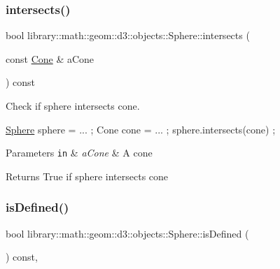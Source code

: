 \subsubsection{\texorpdfstring{intersects()}{intersects()}\hspace{0.1cm}{\footnotesize\ttfamily [9/9]}}
{\footnotesize\ttfamily bool library\+::math\+::geom\+::d3\+::objects\+::\+Sphere\+::intersects (\begin{DoxyParamCaption}\item[{const \hyperlink{classlibrary_1_1math_1_1geom_1_1d3_1_1objects_1_1_cone}{Cone} \&}]{a\+Cone }\end{DoxyParamCaption}) const}



Check if sphere intersects cone. 


\begin{DoxyCode}
\hyperlink{classlibrary_1_1math_1_1geom_1_1d3_1_1objects_1_1_sphere_a55dccc8ea16ee55cd7694c26afa8ea39}{Sphere} sphere = ... ;
Cone cone = ... ;
sphere.intersects(cone) ;
\end{DoxyCode}



\begin{DoxyParams}[1]{Parameters}
\mbox{\tt in}  & {\em a\+Cone} & A cone \\
\hline
\end{DoxyParams}
\begin{DoxyReturn}{Returns}
True if sphere intersects cone 
\end{DoxyReturn}
\mbox{\label{classlibrary_1_1math_1_1geom_1_1d3_1_1objects_1_1_sphere_a0598bd75f8a34e07a3ad36cf10a7f098}} 
\subsubsection{\texorpdfstring{is\+Defined()}{isDefined()}}
{\footnotesize\ttfamily bool library\+::math\+::geom\+::d3\+::objects\+::\+Sphere\+::is\+Defined (\begin{DoxyParamCaption}{ }\end{DoxyParamCaption}) const\hspace{0.3cm}{\ttfamily [override]}, {\ttfamily [virtual]}}



